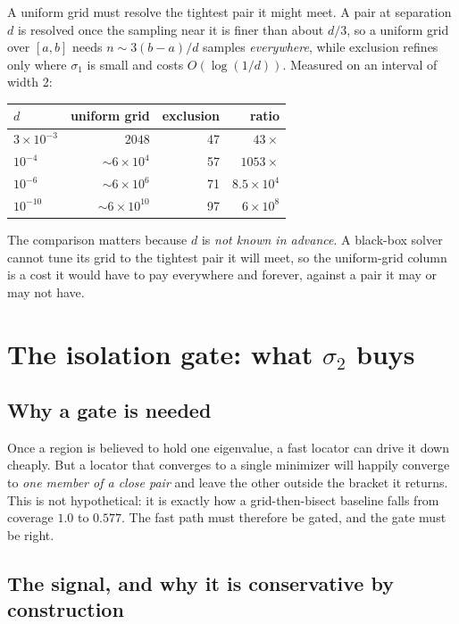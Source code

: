 \documentclass[11pt]{article}
\theoremstyle{definition}
\theoremstyle{remark}
\newcommand{\sig}{\sigma}
\begin{document}
A uniform grid must resolve the tightest pair it might meet. A pair at separation $d$ is
resolved once the sampling near it is finer than about $d/3$, so a uniform grid over $[a,b]$
needs $n\sim 3(b-a)/d$ samples \emph{everywhere}, while exclusion refines only where $\sig_1$
is small and costs $O(\log(1/d))$. Measured on an interval of width 2:
\begin{center}
\begin{tabular}{lrrr}
\toprule
$d$ & uniform grid & exclusion & ratio\\
\midrule
$3\times10^{-3}$ & $2048$ & 47 & $43\times$\\
$10^{-4}$ & ${\sim}6\times10^{4}$ & 57 & $1053\times$\\
$10^{-6}$ & ${\sim}6\times10^{6}$ & 71 & $8.5\times10^{4}$\\
$10^{-10}$ & ${\sim}6\times10^{10}$ & 97 & $6\times10^{8}$\\
\bottomrule
\end{tabular}
\end{center}
The comparison matters because $d$ is \emph{not known in advance}. A black-box solver cannot
tune its grid to the tightest pair it will meet, so the uniform-grid column is a cost it would
have to pay everywhere and forever, against a pair it may or may not have.

\section{The isolation gate: what $\sig_2$ buys}
\label{sec:gate}

\subsection{Why a gate is needed}

Once a region is believed to hold one eigenvalue, a fast locator can drive it down cheaply.
But a locator that converges to a single minimizer will happily converge to \emph{one member of
a close pair} and leave the other outside the bracket it returns. This is not hypothetical: it
is exactly how a grid-then-bisect baseline falls from coverage $1.0$ to $0.577$. The fast path
must therefore be gated, and the gate must be right.

\subsection{The signal, and why it is conservative by construction}
\end{document}

